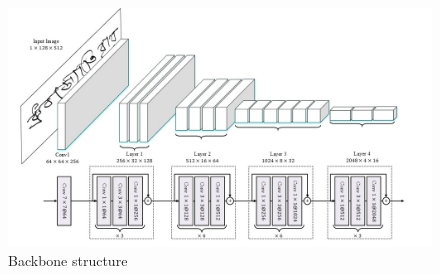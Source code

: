 \begin{figure}[htbp]
  \begin{center}
      \includegraphics[scale=0.45]{figure/backbone.jpg}
  \end{center}
  \caption{Backbone structure}
  \label{fig:backbone}
\end{figure}

